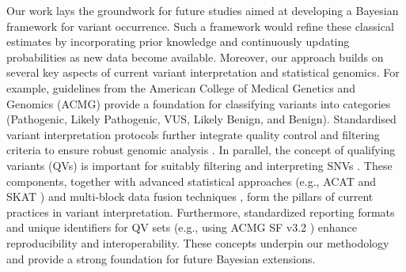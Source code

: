 \documentclass[a4paper,12pt]{article}
\begin{document}
Our work lays the groundwork for future studies aimed at developing a Bayesian framework for variant occurrence. Such a framework would refine these classical estimates by incorporating prior knowledge and continuously updating probabilities as new data become available. Moreover, our approach builds on several key aspects of current variant interpretation and statistical genomics. For example, guidelines from the American College of Medical Genetics and Genomics (ACMG) \citep{richards2015standards, tavtigian2020fitting} provide a foundation for classifying variants into categories (Pathogenic, Likely Pathogenic, VUS, Likely Benign, and Benign). Standardised variant interpretation protocols further integrate quality control and filtering criteria to ensure robust genomic analysis \citep{pedersen2021effective,anderson2010data}. In parallel, the concept of qualifying variants (QVs) is important for suitably filtering and interpreting SNVs \citep{cirulli2015exome, Povysil2019rare}. These components, together with advanced statistical approaches (e.g., ACAT and SKAT \citep{liu2019acat,li2020dynamic,wu2011rare,lee2012optimal}) and multi-block data fusion techniques \citep{kong2018nature,howe2021within}, form the pillars of current practices in variant interpretation. Furthermore, standardized reporting formats and unique identifiers for QV sets (e.g., using ACMG SF v3.2 \citep{miller2023acmg}) enhance reproducibility and interoperability. These concepts underpin our methodology and provide a strong foundation for future Bayesian extensions.



%
\end{document}
